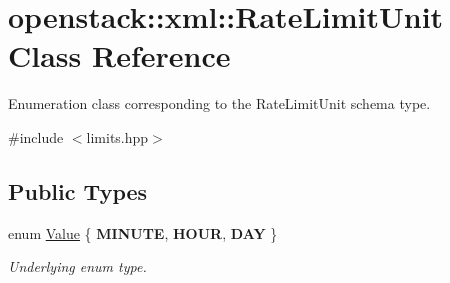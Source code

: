 \hypertarget{classopenstack_1_1xml_1_1RateLimitUnit}{
\section{openstack::xml::RateLimitUnit Class Reference}
\label{classopenstack_1_1xml_1_1RateLimitUnit}
}


Enumeration class corresponding to the RateLimitUnit schema type.  




{\ttfamily \#include $<$limits.hpp$>$}

\subsection*{Public Types}
\begin{DoxyCompactItemize}
\item 
enum \hyperlink{classopenstack_1_1xml_1_1RateLimitUnit_a0851d305ebaa03a6afb5335fbcd70b35}{Value} \{ {\bfseries MINUTE}, 
{\bfseries HOUR}, 
{\bfseries DAY}
 \}
\begin{DoxyCompactList}\small\item\em Underlying enum type. \item\end{DoxyCompactList}\end{DoxyCompactItemize}
